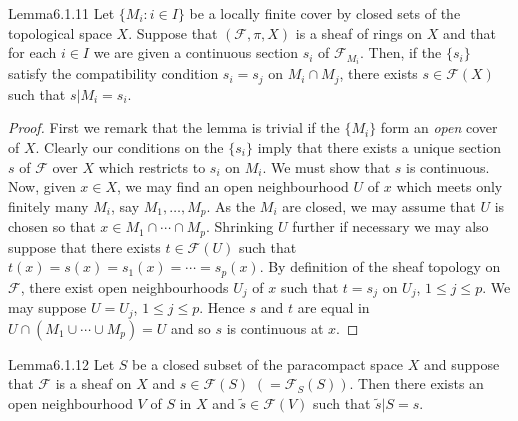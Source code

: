 \begin{originaltheorem}{Lemma}{6.1.11}
Let $\{M_i:i\in I\}$ be a locally finite cover by closed sets of the topological space $X$. Suppose that $(\mathcal F,\pi,X)$ is a sheaf of rings on $X$ and that for each $i\in I$ we are given a continuous section $s_i$ of $\mathcal F_{M_i}$. Then, if the $\{s_i\}$ satisfy the compatibility condition $s_i=s_j$ on $M_i\cap M_j$, there exists $s\in\mathcal F(X)$ such that $s|M_i=s_i$.
\end{originaltheorem}
\begin{proof}
First we remark that the lemma is trivial if the $\{M_i\}$ form an \emph{open} cover of $X$. Clearly our conditions on the $\{s_i\}$ imply that there exists a unique section $s$ of $\mathcal F$ over $X$ which restricts to $s_i$ on $M_i$. We must show that $s$ is continuous. Now, given $x\in X$, we may find an open neighbourhood $U$ of $x$ which meets only finitely many $M_i$, say $M_1,\ldots,M_p$. As the $M_i$ are closed, we may assume that $U$ is chosen so that $x\in M_1\cap\cdots\cap M_p$. Shrinking $U$ further if necessary we may also suppose that there exists $t\in\mathcal F(U)$ such that $t(x)=s(x)=s_1(x)=\cdots=s_p(x)$. By definition of the sheaf topology on $\mathcal F$, there exist open neighbourhoods $U_j$ of $x$ such that $t=s_j$ on $U_j$, $1\leq j\leq p$. We may suppose $U=U_j$, $1\leq j\leq p$. Hence $s$ and $t$ are equal in $U\cap(M_1\cup\cdots\cup M_p)=U$ and so $s$ is continuous at $x$.
\end{proof}
\begin{originaltheorem}{Lemma}{6.1.12}
Let $S$ be a closed subset of the paracompact space $X$ and suppose that $\mathcal F$ is a sheaf on $X$ and $s\in\mathcal F(S)$ $(=\mathcal F_S(S))$. Then there exists an open neighbourhood $V$ of $S$ in $X$ and $\widetilde s\in\mathcal F(V)$ such that $\widetilde s|S=s$.
\end{originaltheorem}
